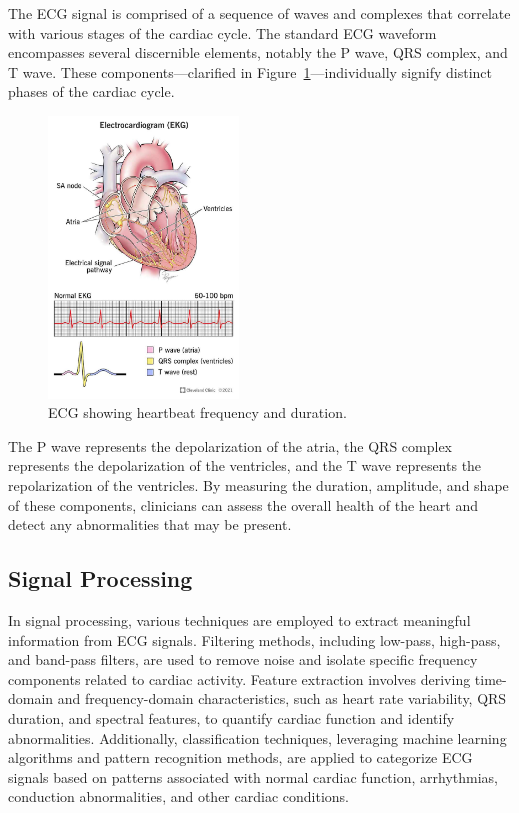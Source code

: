 \documentclass{zc-ust-hw}
\begin{document}
The ECG signal is comprised of a sequence of waves and complexes that correlate
with various stages of the cardiac cycle. The standard ECG waveform encompasses
several discernible elements, notably the P wave, QRS complex, and T wave.
These components---clarified in Figure~\ref{fig:ecg}---individually signify distinct phases of the cardiac
cycle.
\cite{clevelandclinic_2019_electrocardiogram}

\begin{figure}[h]
  \begin{center}
    \includegraphics[width=0.45\textwidth]{figures/ecgdiagram.jpg}
  \end{center}
  \caption{ECG showing heartbeat frequency and duration.
  \cite{clevelandclinic_2019_electrocardiogram}}
  \label{fig:ecg}
\end{figure}

The P wave represents the depolarization of the atria, the QRS complex
represents the depolarization of the ventricles, and the T wave represents the
repolarization of the ventricles. By measuring the duration, amplitude, and
shape of these components, clinicians can assess the overall health of the
heart and detect any abnormalities that may be present.
\cite{clevelandclinic_2019_electrocardiogram}

\subsection{Signal Processing}

In signal processing, various techniques are employed to extract meaningful
information from ECG signals. Filtering methods, including low-pass, high-pass,
and band-pass filters, are used to remove noise and isolate specific frequency
components related to cardiac activity. Feature extraction involves deriving
time-domain and frequency-domain characteristics, such as heart rate
variability, QRS duration, and spectral features, to quantify cardiac function
and identify abnormalities. Additionally, classification techniques, leveraging
machine learning algorithms and pattern recognition methods, are applied to
categorize ECG signals based on patterns associated with normal cardiac
function, arrhythmias, conduction abnormalities, and other cardiac conditions.
\end{document}
